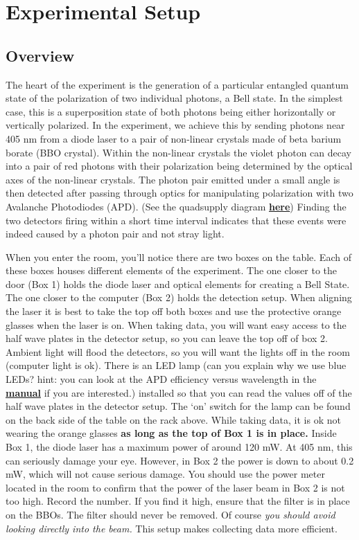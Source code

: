 \documentclass{../lab}
\begin{document}
\section{Experimental Setup}

\subsection{Overview}

The heart of the experiment is the generation of a particular entangled quantum state of the polarization of two individual photons, a Bell state. In the simplest case, this is a superposition state of both photons being either horizontally or vertically polarized. In the experiment, we achieve this by sending photons near 405 nm from a diode laser to a pair of non-linear crystals made of beta barium borate (BBO crystal). Within the non-linear crystals the violet photon can decay into a pair of red photons with their polarization being determined by the optical axes of the non-linear crystals. The photon pair emitted under a small angle is then detected after passing through optics for manipulating polarization with two Avalanche Photodiodes (APD). (See the quadsupply diagram \href{http://physics111.lib.berkeley.edu/Physics111/Reprints/QIE/QIE_apd_quadsupply1.pdf}{\textbf{here}}) Finding the two detectors firing within a short time interval indicates that these events were indeed caused by a photon pair and not stray light.

When you enter the room, you'll notice there are two boxes on the table. Each of these boxes houses different elements of the experiment. The one closer to the door (Box 1) holds the diode laser and optical elements for creating a Bell State. The one closer to the computer (Box 2) holds the detection setup. When aligning the laser it is best to take the top off both boxes and use the protective orange glasses when the laser is on. When taking data, you will want easy access to the half wave plates in the detector setup, so you can leave the top off of box 2. Ambient light will flood the detectors, so you will want the lights off in the room (computer light is ok). There is an LED lamp \cite{Bluelaser} (can you explain why we use blue LEDs? hint: you can look at the APD efficiency versus wavelength in the \href{http://physics111.lib.berkeley.edu/Physics111/Reprints/QIE/SPCMAQRH.pdf}{\textbf{manual}} if you are interested.) installed so that you can read the values off of the half wave plates in the detector setup. The `on' switch for the lamp can be found on the back side of the table on the rack above. While taking data, it is ok not wearing the orange glasses \textbf{as long as the top of Box 1 is in place.} Inside Box 1, the diode laser has a maximum power of around 120 mW. At 405 nm, this can seriously damage your eye. However, in Box 2 the power is down to about 0.2 mW, which will not cause serious damage. You should use the power meter located in the room to confirm that the power of the laser beam in Box 2 is not too high. Record the number. If you find it high, ensure that the filter is in place on the BBOs. The filter should never be removed. Of course \emph{you should avoid looking directly into the beam.} This setup makes collecting data more efficient.
\end{document}
